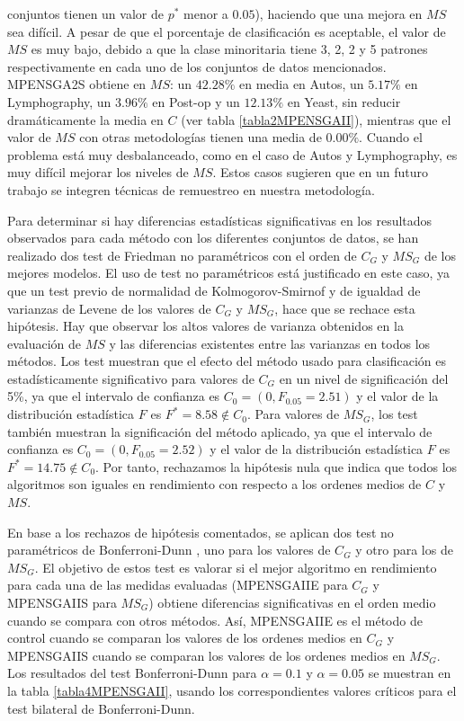 \begin{enumerate}
conjuntos tienen un valor de $p^*$ menor a $0.05$), haciendo que una mejora en
$MS$ sea difícil. A pesar de que el porcentaje de clasificación es aceptable, el valor de
$MS$ es muy bajo, debido a que la clase minoritaria tiene 3, 2, 2 y 5 patrones
respectivamente en cada uno de los conjuntos de datos mencionados. MPENSGA2S obtiene en $MS$: un
$42.28\%$ en media en Autos, un $5.17\%$
en Lymphography, un $3.96\%$ en Post-op y un $12.13\%$ en Yeast, sin reducir
dramáticamente la media en $C$ (ver tabla \ref{tabla2MPENSGAII}), mientras que el valor
de $MS$ con otras metodologías tienen una media de $0.00\%$. Cuando el problema está
muy desbalanceado, como en el caso de Autos y Lymphography, es muy difícil mejorar los
niveles de $MS$. Estos casos sugieren que en un futuro trabajo se integren técnicas de
remuestreo \cite{Chawla2002} en nuestra metodología.
\end{enumerate}

Para determinar si hay diferencias estadísticas significativas en los resultados
observados para cada método con los diferentes conjuntos de datos, se han realizado dos
test de Friedman no paramétricos \cite{Friedman1940} con el orden de $C_{G}$ y
$MS_{G}$ de los mejores modelos. El uso de test no paramétricos está justificado en este
caso, ya que un test previo de normalidad de Kolmogorov-Smirnof y de igualdad de
varianzas de Levene de los valores de $C_{G}$ y $MS_{G}$, hace que se
rechace esta hipótesis. Hay que observar los altos valores
de varianza obtenidos en la evaluación de $MS$ y las diferencias existentes entre las
varianzas en todos los métodos. Los test muestran que el efecto del método usado para
clasificación es estadísticamente significativo para valores de $C_{G}$ en un nivel de
significación del 5\%, ya que el intervalo de confianza es $C_{0}=(0,F_{0.05}=2.51)$ y
el valor de la distribución estadística $F$ es $F^*=8.58\notin C_{0}$. Para valores de
$MS_{G}$, los test también muestran la significación del método aplicado, ya que el
intervalo de confianza es $C_{0}=(0,F_{0.05}=2.52)$ y el valor de la distribución
estadística $F$ es $F^*=14.75\notin C_{0}$. Por tanto, rechazamos la hipótesis nula que
indica que todos los algoritmos son iguales en rendimiento con respecto a los
ordenes medios de $C$ y $MS$.

En base a los rechazos de hipótesis comentados, se aplican dos test no paramétricos de
Bonferroni-Dunn \cite{Dunn1961,Hochberg1987}, uno para los valores de $C_{G}$ y otro para
los de $MS_{G}$. El objetivo de estos test es valorar si el mejor algoritmo en
rendimiento para cada una de las medidas evaluadas (MPENSGAIIE para $C_{G}$ y MPENSGAIIS
para $MS_{G}$) obtiene diferencias significativas en el orden medio cuando se
compara con otros métodos. Así, MPENSGAIIE es el método de control cuando se comparan
los valores de los ordenes medios en $C_{G}$ y MPENSGAIIS cuando se comparan
los valores de los ordenes medios en $MS_{G}$. Los resultados del test
Bonferroni-Dunn para $\alpha=0.1$ y $\alpha=0.05$ se muestran en la tabla
\ref{tabla4MPENSGAII}, usando los correspondientes valores críticos para el test
bilateral de Bonferroni-Dunn.

